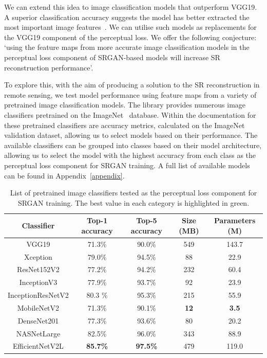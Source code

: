 We can extend this idea to image classification models that outperform VGG19. A superior classification accuracy suggests the model has better extracted the most important image features~\cite{featureExtraction}. We can utilise such models as replacements for the VGG19 component of the perceptual loss. We offer the following conjecture: `using the feature maps from more accurate image classification models in the perceptual loss component of SRGAN-based models will increase SR reconstruction performance'.

To explore this, with the aim of producing a solution to the SR reconstruction in remote sensing, we test model performance using feature maps from a variety of pretrained image classification models. The  library provides numerous image classifiers pretrained on the ImageNet~\cite{imageNet} database. Within the documentation for these pretrained classifiers are accuracy metrics, calculated on the ImageNet validation dataset, allowing us to select models based on their performance. The available classifiers can be grouped into classes based on their model architecture, allowing us to select the model with the highest accuracy from each class as the perceptual loss component for SRGAN training. A full list of available models can be found in Appendix~\ref{appendix}.
\begin{table}
    \centering
    \begin{tabular}{ccccc}
        \toprule
        \textbf{Classifier} & \textbf{Top-1 accuracy} & \textbf{Top-5 accuracy} & \textbf{Size (MB)} & \textbf{Parameters (M)} \\
        \midrule
        VGG19 & 71.3\% & 90.0\% & 549 & 143.7 \\
        Xception & 79.0\% & 94.5\% & 88 & 22.9 \\
        ResNet152V2 & 77.2\% & 94.2\% & 232 & 60.4 \\
        InceptionV3 & 77.9\% & 93.7\% & 92 & 23.9 \\
        InceptionResNetV2 & 80.3 \% & 95.3\% & 215 & 55.9 \\
        MobileNetV2 & 71.3\% & 90.1\% & \textbf{12} & \textbf{3.5} \\
        DenseNet201 & 77.3\% & 93.6\% & 80 & 20.2 \\
        NASNetLarge & 82.5\% & 96.0\% & 343 & 88.9 \\
    EfficientNetV2L & \textbf{85.7\%} & \textbf{97.5\%} & 479 & 119.0 \\
        \bottomrule
    \end{tabular}
    \caption{List of pretrained image classifiers tested as the perceptual loss component for SRGAN training. The best value in each category is highlighted in green.}
    \label{table:pretrained_classifiers}
\end{table}

